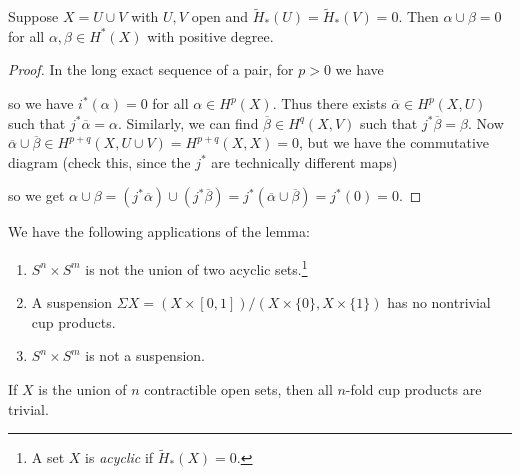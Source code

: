 \begin{lemma}
  Suppose $X = U \cup V$ with $U, V$ open
  and $\widetilde{H}_*(U) = \widetilde{H}_*(V) = 0$.
  Then $\alpha \cup \beta = 0$ for all
  $\alpha, \beta \in H^*(X)$ with positive
  degree.
\end{lemma}

\begin{proof}
  In the long exact sequence of a pair, for $p > 0$ we have
  \begin{center}
  \end{center}
  so we have $i^*(\alpha) = 0$ for all
  $\alpha \in H^p(X)$. Thus there exists
  $\overline{\alpha} \in H^p(X, U)$ such that
  $j^* \overline{\alpha} = \alpha$.
  Similarly, we can find $\overline{\beta} \in H^q(X, V)$
  such that $j^* \overline{\beta} = \beta$.
  Now $\overline{\alpha} \cup \overline{\beta} \in H^{p+q}(X, U \cup V) = H^{p + q}(X, X) = 0$,
  but we have the commutative diagram
  (check this, since the $j^*$ are technically
  different maps)
  \begin{center}
  \end{center}
  so we get $\alpha \cup \beta = (j^* \overline{\alpha}) \cup (j^* \overline{\beta}) = j^*(\overline{\alpha} \cup \overline{\beta}) = j^*(0) = 0$.
\end{proof}

\begin{example}
  We have the following applications
  of the lemma:
  \begin{enumerate}
    \item $S^n \times S^m$ is not the union of
      two acyclic sets.\footnote{A set $X$ is \emph{acyclic} if $\widetilde{H}_*(X) = 0$.}
    \item A suspension $\Sigma X = (X \times [0, 1]) / (X \times \{0\}, X \times \{1\})$
      has no nontrivial cup products.
    \item $S^n \times S^m$ is not a suspension.
  \end{enumerate}
\end{example}

\begin{exercise}
  If $X$ is the union of $n$
  contractible
  open sets, then all $n$-fold
  cup products are trivial.
\end{exercise}
